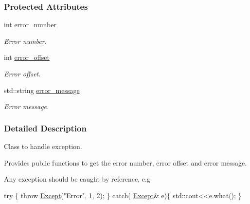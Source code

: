 \subsubsection*{Protected Attributes}
\begin{DoxyCompactItemize}
\item 
int \hyperlink{classjpcre2_1_1Except_aa72e1a71b4cdf1d4baecce57b63caafc}{error\+\_\+number}\hypertarget{classjpcre2_1_1Except_aa72e1a71b4cdf1d4baecce57b63caafc}{}\label{classjpcre2_1_1Except_aa72e1a71b4cdf1d4baecce57b63caafc}

\begin{DoxyCompactList}\small\item\em Error number. \end{DoxyCompactList}\item 
int \hyperlink{classjpcre2_1_1Except_a12b09693ebee9b4a8b981ec1bd7506c4}{error\+\_\+offset}\hypertarget{classjpcre2_1_1Except_a12b09693ebee9b4a8b981ec1bd7506c4}{}\label{classjpcre2_1_1Except_a12b09693ebee9b4a8b981ec1bd7506c4}

\begin{DoxyCompactList}\small\item\em Error offset. \end{DoxyCompactList}\item 
std\+::string \hyperlink{classjpcre2_1_1Except_a88590c6c8c512608c1000639d527dd55}{error\+\_\+message}\hypertarget{classjpcre2_1_1Except_a88590c6c8c512608c1000639d527dd55}{}\label{classjpcre2_1_1Except_a88590c6c8c512608c1000639d527dd55}

\begin{DoxyCompactList}\small\item\em Error message. \end{DoxyCompactList}\end{DoxyCompactItemize}


\subsubsection{Detailed Description}
Class to handle exception. 

Provides public functions to get the error number, error offset and error message.

Any exception should be caught by reference, e.\+g 
\begin{DoxyCode}
\textcolor{keywordflow}{try} \{
    \textcolor{keywordflow}{throw} \hyperlink{classjpcre2_1_1Except_a302b67f0fbc5f906bac67a4572ff29ec}{Except}(\textcolor{stringliteral}{"Error"}, 1, 2);
\}
\textcolor{keywordflow}{catch}( \hyperlink{classjpcre2_1_1Except_a302b67f0fbc5f906bac67a4572ff29ec}{Except}& e)\{
    std::cout<<e.what();
\}
\end{DoxyCode}
 

